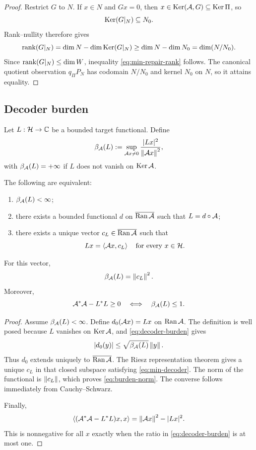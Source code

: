 \begin{proof}
Restrict $G$ to $N$.  If $x\in N$ and $Gx=0$, then $x\in\operatorname{Ker}(\mathcal A,G)\subseteq\operatorname{Ker}\Pi$, so
\[
\operatorname{Ker}(G|_N)\subseteq N_0.
\]
Rank--nullity therefore gives
\[
\operatorname{rank}(G|_N)
=\dim N-\dim\operatorname{Ker}(G|_N)
\ge \dim N-\dim N_0
=\dim(N/N_0).
\]
Since $\operatorname{rank}(G|_N)\le\dim W$, inequality \eqref{eq:min-repair-rank} follows.  The canonical quotient observation $q_\Pi P_N$ has codomain $N/N_0$ and kernel $N_0$ on $N$, so it attains equality.
\end{proof}

\subsection{Decoder burden}

Let $L:\mathcal H\to\mathbb C$ be a bounded target functional.  Define
\begin{equation}
\beta_{\mathcal A}(L)
:=\sup_{\mathcal A x\ne0}
\frac{|Lx|^2}{\left\lVert\mathcal A x\right\rVert^2},
\label{eq:decoder-burden}
\end{equation}
with $\beta_{\mathcal A}(L)=+\infty$ if $L$ does not vanish on $\operatorname{Ker}\mathcal A$.

\begin{theorem}
The following are equivalent:
\begin{enumerate}[label=(\roman*)]
\item $\beta_{\mathcal A}(L)<\infty$;
\item there exists a bounded functional $d$ on $\overline{\operatorname{Ran}\mathcal A}$ such that $L=d\circ\mathcal A$;
\item there exists a unique vector $c_L\in\overline{\operatorname{Ran}\mathcal A}$ such that
\begin{equation}
Lx=\left\langle \mathcal A x,c_L\right\rangle
\quad\text{for every }x\in\mathcal H.
\label{eq:min-decoder}
\end{equation}
\end{enumerate}
For this vector,
\begin{equation}
\beta_{\mathcal A}(L)=\left\lVert c_L\right\rVert^2.
\label{eq:burden-norm}
\end{equation}
Moreover,
\begin{equation}
\mathcal A^*\mathcal A-L^*L\ge0
\quad\Longleftrightarrow\quad
\beta_{\mathcal A}(L)\le1.
\label{eq:reserve-equivalence}
\end{equation}
\end{theorem}

\begin{proof}
Assume $\beta_{\mathcal A}(L)<\infty$.  Define $d_0(\mathcal A x)=Lx$ on $\operatorname{Ran}\mathcal A$.  The definition is well posed because $L$ vanishes on $\operatorname{Ker}\mathcal A$, and \eqref{eq:decoder-burden} gives
\[
|d_0(y)|\le\sqrt{\beta_{\mathcal A}(L)}\left\lVert y\right\rVert.
\]
Thus $d_0$ extends uniquely to $\overline{\operatorname{Ran}\mathcal A}$.  The Riesz representation theorem gives a unique $c_L$ in that closed subspace satisfying \eqref{eq:min-decoder}.  The norm of the functional is $\left\lVert c_L\right\rVert$, which proves \eqref{eq:burden-norm}.  The converse follows immediately from Cauchy--Schwarz.

Finally,
\[
\left\langle (\mathcal A^*\mathcal A-L^*L)x,x\right\rangle
=\left\lVert\mathcal A x\right\rVert^2-|Lx|^2.
\]
This is nonnegative for all $x$ exactly when the ratio in \eqref{eq:decoder-burden} is at most one.
\end{proof}

